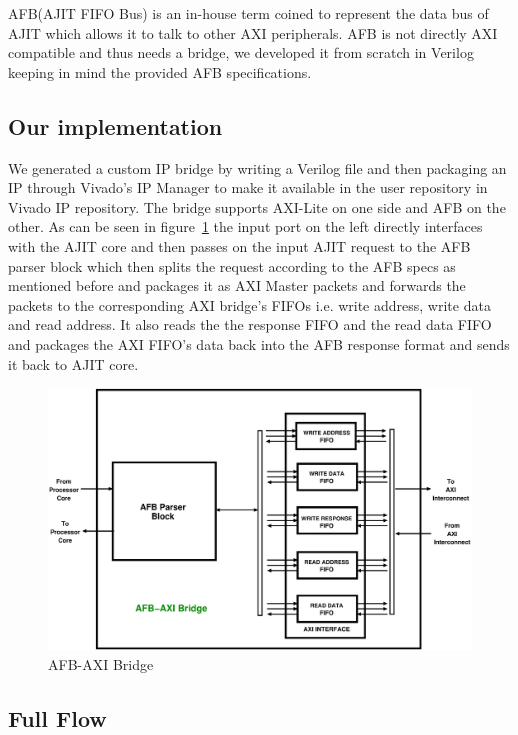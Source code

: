 AFB(AJIT FIFO Bus) is an in-house term coined to represent the data bus of AJIT which allows it to talk to other AXI peripherals. AFB is not
directly AXI compatible and thus needs a bridge, we developed it from scratch in Verilog keeping in mind the provided AFB specifications.

\subsection{Our implementation}

We generated a custom IP bridge by writing a Verilog file and then packaging an IP through Vivado's IP Manager to make it available in the
user repository in Vivado IP repository. The bridge supports AXI-Lite on one side and AFB on the other. As can be seen in
figure~\ref{AFB-AXI bridge} the input port on the left directly interfaces with the AJIT core and then passes on the input AJIT request to
the AFB parser block which then splits the request according to the AFB specs as mentioned before and packages it as AXI Master packets and
forwards the packets to the corresponding AXI bridge's FIFOs i.e. write address, write data and read address. It also reads the the response
FIFO and the read data FIFO and packages the AXI FIFO's data back into the AFB response format and sends it back to AJIT core.

\begin{figure}[H]
\includegraphics[width=\textwidth]{eps_pdf_sources/ajit_fpga/AFB_AXI_bridge/AFB_AXI_bridge_expanded}
\caption{AFB-AXI Bridge}
\label{AFB-AXI bridge}
\end{figure}

\subsection{Full Flow}

